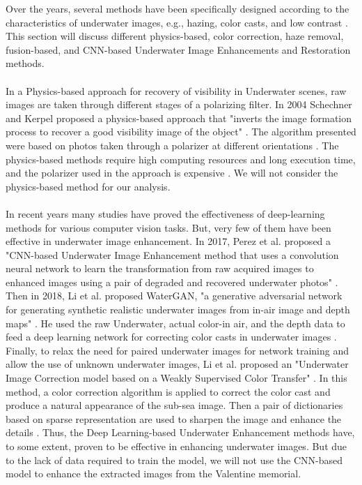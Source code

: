 \documentclass[a4paper,11pt,oneside]{article}
\begin{document}
  Over the years, several methods have been specifically designed according to the characteristics of underwater images, e.g., hazing, color casts, and low contrast \cite{15}. This section will discuss different physics-based, color correction, haze removal, fusion-based, and CNN-based Underwater Image Enhancements and Restoration methods.\\
  \\
  In a Physics-based approach for recovery of visibility in Underwater scenes, raw images are taken through different stages of a polarizing filter. In 2004 Schechner and Kerpel \cite{19} proposed a physics-based approach that "inverts the image formation process to recover a good visibility image of the object" \cite{19}. The algorithm presented were based on photos taken through a polarizer at different orientations \cite{19}. The physics-based methods require high computing resources and long execution time, and the polarizer used in the approach is expensive \cite{8}. We will not consider the physics-based method for our analysis.\\
  \\
  In recent years many studies have proved the effectiveness of deep-learning methods for various computer vision tasks. But, very few of them have been effective in underwater image enhancement. In 2017, Perez et al. \cite{22} proposed a "CNN-based Underwater Image Enhancement method that uses a convolution neural network to learn the transformation from raw acquired images to enhanced images using a pair of degraded and recovered underwater photos" \cite{22} \cite{15}. Then in 2018, Li et al. \cite{23} proposed WaterGAN, "a generative adversarial network for generating synthetic realistic underwater images from in-air image and depth maps" \cite{23}. He used the raw Underwater, actual color-in air, and the depth data to feed a deep learning network for correcting color casts in underwater images \cite{15}. Finally, to relax the need for paired underwater images for network training and allow the use of unknown underwater images, Li et al. \cite{7} proposed an "Underwater Image Correction model based on a Weakly Supervised Color Transfer" \cite{15}. In this method, a color correction algorithm is applied to correct the color cast and produce a natural appearance of the sub-sea image. Then a pair of dictionaries based on sparse representation are used to sharpen the image and enhance the details \cite{7}. Thus, the Deep Learning-based Underwater Enhancement methods have, to some extent, proven to be effective in enhancing underwater images. But due to the lack of data required to train the model, we will not use the CNN-based model to enhance the extracted images from the Valentine memorial.
\end{document}
